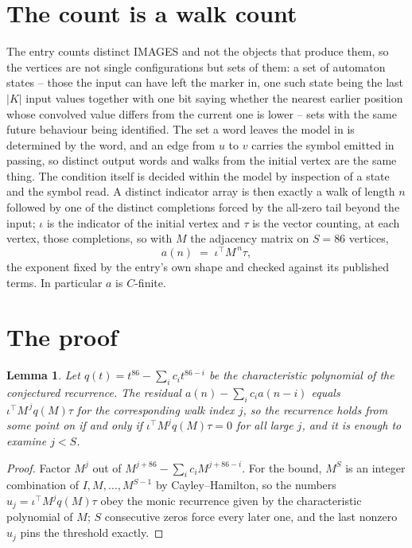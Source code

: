 \documentclass[11pt,a4paper]{article}
\theoremstyle{plain}
\newtheorem{lemma}[theorem]{Lemma}
\theoremstyle{definition}
\begin{document}
\section{The count is a walk count}

The entry counts distinct IMAGES and not the objects that produce them, so the vertices are not single configurations but sets of them: a set of automaton states -- those the input can have left the marker in, one such state being the last $|K|$ input values together with one bit saying whether the nearest earlier position whose convolved value differs from the current one is lower -- sets with the same future behaviour being identified. The set a word leaves the model in is determined by the word, and an edge from $u$ to $v$ carries the symbol emitted in passing, so distinct output words and walks from the initial vertex are the same thing. The condition itself is decided within the model by inspection of a state and the symbol read.
A distinct indicator array is then exactly a walk of length $n$ followed by one of the distinct completions forced by the all-zero tail beyond the input; $\iota$ is the indicator of the initial vertex and $\tau$ is the vector counting, at each vertex, those completions, so with $M$ the adjacency matrix on $S=86$ vertices,
\[
a(n)\;=\;\iota^{\!\top}M^{\,n}\tau ,
\]
the exponent fixed by the entry's own shape and checked against its published terms. In
particular $a$ is $C$-finite.

\section{The proof}

\begin{lemma}\label{lem:crit}
Let $q(t)=t^{86}-\sum_i c_it^{86-i}$ be the characteristic polynomial of the
conjectured recurrence. The residual $a(n)-\sum_ic_ia(n-i)$ equals
$\iota^{\!\top}M^{\,j}q(M)\tau$ for the corresponding walk index $j$, so the recurrence
holds from some point on if and only if $\iota^{\!\top}M^{j}q(M)\tau=0$ for all large $j$,
and it is enough to examine $j<S$.
\end{lemma}

\begin{proof}
Factor $M^{j}$ out of $M^{j+86}-\sum_ic_iM^{j+86-i}$. For the bound, $M^{S}$
is an integer combination of $I,M,\dots,M^{S-1}$ by Cayley--Hamilton, so the numbers
$u_j=\iota^{\!\top}M^{j}q(M)\tau$ obey the monic recurrence given by the characteristic
polynomial of $M$; $S$ consecutive zeros force every later one, and the last nonzero $u_j$
pins the threshold exactly.
\end{proof}
\end{document}
